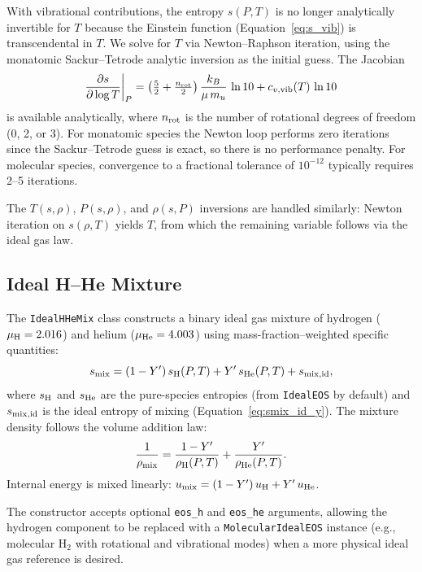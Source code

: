 \documentclass[twocolumn]{aastex701}
\begin{document}
With vibrational contributions, the entropy $s(P,T)$ is no longer analytically invertible for $T$ because the Einstein function (Equation~\ref{eq:s_vib}) is transcendental in $T$.
We solve for $T$ via Newton--Raphson iteration, using the monatomic Sackur--Tetrode analytic inversion as the initial guess.
The Jacobian
\begin{equation}
    \frac{\partial s}{\partial \log T}\bigg|_P = \left(\tfrac{5}{2} + \tfrac{n_{\rm rot}}{2}\right) \frac{k_B}{\mu\, m_u}\,\ln 10 + c_{v,\rm vib}(T)\,\ln 10
\end{equation}
is available analytically, where $n_{\rm rot}$ is the number of rotational degrees of freedom (0, 2, or 3).
For monatomic species the Newton loop performs zero iterations since the Sackur--Tetrode guess is exact, so there is no performance penalty.
For molecular species, convergence to a fractional tolerance of $10^{-12}$ typically requires 2--5 iterations.

The $T(s,\rho)$, $P(s,\rho)$, and $\rho(s,P)$ inversions are handled similarly: Newton iteration on $s(\rho,T)$ yields $T$, from which the remaining variable follows via the ideal gas law.

\subsection{Ideal H--He Mixture}\label{sec:ideal_hhe}

The \texttt{IdealHHeMix} class constructs a binary ideal gas mixture of hydrogen ($\mu_{\rm H} = 2.016$) and helium ($\mu_{\rm He} = 4.003$) using mass-fraction--weighted specific quantities:
\begin{equation}
    s_{\rm mix} = (1-Y')\,s_{\rm H}(P,T) + Y'\,s_{\rm He}(P,T) + s_{\rm mix,id},
\end{equation}
where $s_{\rm H}$ and $s_{\rm He}$ are the pure-species entropies (from \texttt{IdealEOS} by default) and $s_{\rm mix,id}$ is the ideal entropy of mixing (Equation~\ref{eq:smix_id_y}).
The mixture density follows the volume addition law:
\begin{equation}
    \frac{1}{\rho_{\rm mix}} = \frac{1-Y'}{\rho_{\rm H}(P,T)} + \frac{Y'}{\rho_{\rm He}(P,T)}.
\end{equation}
Internal energy is mixed linearly: $u_{\rm mix} = (1-Y')\,u_{\rm H} + Y'\,u_{\rm He}$.

The constructor accepts optional \texttt{eos\_h} and \texttt{eos\_he} arguments, allowing the hydrogen component to be replaced with a \texttt{MolecularIdealEOS} instance (e.g., molecular H$_2$ with rotational and vibrational modes) when a more physical ideal gas reference is desired.
\end{document}
